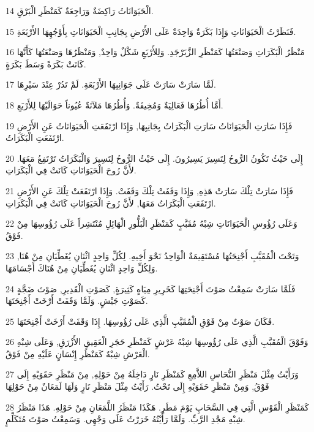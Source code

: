 \par 14 الْحَيَوَانَاتُ رَاكِضَةٌ وَرَاجِعَةٌ كَمَنْظَرِ الْبَرْقِ.
\par 15 فَنَظَرْتُ الْحَيَوَانَاتِ وَإِذَا بَكَرَةٌ وَاحِدَةٌ عَلَى الأَرْضِ بِجَانِبِ الْحَيَوَانَاتِ بِأَوْجُهِهَا الأَرْبَعَةِ.
\par 16 مَنْظَرُ الْبَكَرَاتِ وَصَنْعَتُهَا كَمَنْظَرِ الزَّبَرْجَدِ. وَلِلأَرْبَعِ شَكْلٌ وَاحِدٌ, وَمَنْظَرُهَا وَصَنْعَتُهَا كَأَنَّهَا كَانَتْ بَكَرَةً وَسَطَ بَكَرَةٍ.
\par 17 لَمَّا سَارَتْ سَارَتْ عَلَى جَوَانِبِهَا الأَرْبَعَةِ. لَمْ تَدُرْ عِنْدَ سَيْرِهَا.
\par 18 أَمَّا أُطُرُهَا فَعَالِيَةٌ وَمُخِيفَةٌ. وَأُطُرُهَا مَلآنَةٌ عُيُوناً حَوَالَيْهَا لِلأَرْبَعِ.
\par 19 فَإِذَا سَارَتِ الْحَيَوَانَاتُ سَارَتِ الْبَكَرَاتُ بِجَانِبِهَا, وَإِذَا ارْتَفَعَتِ الْحَيَوَانَاتُ عَنِ الأَرْضِ ارْتَفَعَتِ الْبَكَرَاتُ.
\par 20 إِلَى حَيْثُ تَكُونُ الرُّوحُ لِتَسِيرَ يَسِيرُونَ. إِلَى حَيْثُ الرُّوحُ لِتَسِيرَ وَالْبَكَرَاتُ تَرْتَفِعُ مَعَهَا. لأَنَّ رُوحَ الْحَيَوَانَاتِ كَانَتْ فِي الْبَكَرَاتِ.
\par 21 فَإِذَا سَارَتْ تِلْكَ سَارَتْ هَذِهِ, وَإِذَا وَقَفَتْ تِلْكَ وَقَفَتْ. وَإِذَا ارْتَفَعَتْ تِلْكَ عَنِ الأَرْضِ ارْتَفَعَتِ الْبَكَرَاتُ مَعَهَا, لأَنَّ رُوحَ الْحَيَوَانَاتِ كَانَتْ فِي الْبَكَرَاتِ.
\par 22 وَعَلَى رُؤُوسِ الْحَيَوَانَاتِ شِبْهُ مُقَبَّبٍ كَمَنْظَرِ الْبَلُّورِ الْهَائِلِ مُنْتَشِراً عَلَى رُؤُوسِهَا مِنْ فَوْقُ.
\par 23 وَتَحْتَ الْمُقَبَّبِ أَجْنِحَتُهَا مُسْتَقِيمَةٌ الْوَاحِدُ نَحْوَ أَخِيهِ. لِكُلِّ وَاحِدٍ اثْنَانِ يُغَطِّيَانِ مِنْ هُنَا, وَلِكُلِّ وَاحِدٍ اثْنَانِ يُغَطِّيَانِ مِنْ هُنَاكَ أَجْسَامَهَا.
\par 24 فَلَمَّا سَارَتْ سَمِعْتُ صَوْتَ أَجْنِحَتِهَا كَخَرِيرِ مِيَاهٍ كَثِيرَةٍ, كَصَوْتِ الْقَدِيرِ, صَوْتَ ضَجَّةٍ كَصَوْتِ جَيْشٍ. وَلَمَّا وَقَفَتْ أَرْخَتْ أَجْنِحَتَهَا.
\par 25 فَكَانَ صَوْتٌ مِنْ فَوْقِ الْمُقَبَّبِ الَّذِي عَلَى رُؤُوسِهَا. إِذَا وَقَفَتْ أَرْخَتْ أَجْنِحَتَهَا.
\par 26 وَفَوْقَ الْمُقَبَّبِ الَّذِي عَلَى رُؤُوسِهَا شِبْهُ عَرْشٍ كَمَنْظَرِ حَجَرِ الْعَقِيقِ الأَزْرَقِ, وَعَلَى شِبْهِ الْعَرْشِ شِبْهٌ كَمَنْظَرِ إِنْسَانٍ عَلَيْهِ مِنْ فَوْقُ.
\par 27 وَرَأَيْتُ مِثْلَ مَنْظَرِ النُّحَاسِ اللاَّمِعِ كَمَنْظَرِ نَارٍ دَاخِلَهُ مِنْ حَوْلِهِ, مِنْ مَنْظَرِ حَقَوَيْهِ إِلَى فَوْقُ, وَمِنْ مَنْظَرِ حَقَوَيْهِ إِلَى تَحْتُ. رَأَيْتُ مِثْلَ مَنْظَرِ نَارٍ وَلَهَا لَمَعَانٌ مِنْ حَوْلِهَا
\par 28 كَمَنْظَرِ الْقَوْسِ الَّتِي فِي السَّحَابِ يَوْمَ مَطَرٍ. هَكَذَا مَنْظَرُ اللَّمَعَانِ مِنْ حَوْلِهِ. هَذَا مَنْظَرُ شِبْهِ مَجْدِ الرَّبِّ. وَلَمَّا رَأَيْتُهُ خَرَرْتُ عَلَى وَجْهِي. وَسَمِعْتُ صَوْتَ مُتَكَلِّمٍ.

